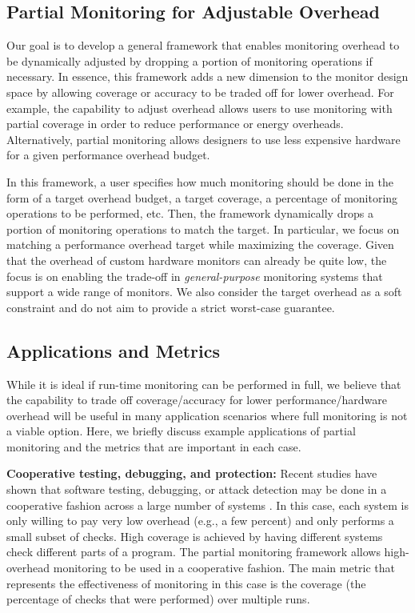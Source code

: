\subsection{Partial Monitoring for Adjustable Overhead}

Our goal is to develop a general framework that enables monitoring
overhead to be dynamically adjusted by dropping a portion of monitoring
operations if necessary. In essence, this framework adds a new dimension to the
monitor design space by allowing coverage or accuracy to be traded off for
lower overhead. For example, the capability to adjust overhead allows users to
use monitoring with partial coverage in order to reduce performance or energy
overheads. Alternatively, partial monitoring allows designers to use less
expensive hardware for a given performance overhead budget.

In this framework, a user specifies how much monitoring should be done in the
form of a target overhead budget, a target coverage, a percentage of monitoring
operations to be performed, etc.  Then, the framework dynamically drops a
portion of monitoring operations to match the target. In particular, we
focus on matching a performance overhead target while maximizing the
coverage. Given that the overhead of custom hardware monitors can already be
quite low, the focus is on enabling the trade-off in {\em general-purpose}
monitoring systems that support a wide range of monitors.  We also consider the
target overhead as a soft constraint and do not aim to provide a strict
worst-case guarantee.

\subsection{Applications and Metrics}

While it is ideal if run-time monitoring can be performed in full, we believe
that the capability to trade off coverage/accuracy for lower
performance/hardware overhead will be useful in many application scenarios
where full monitoring is not a viable option.  Here, we briefly discuss example
applications of partial monitoring and the metrics that are important in each
case.

{\bf Cooperative testing, debugging, and protection:} 
Recent studies have shown that software testing, debugging, or attack detection
may be done in a cooperative fashion across a large number of systems
\cite{liblit-pldi05, chilimbi-asplos04, greathouse-cgo11, testudo-micro08}. In
this case, each system is only willing to pay very low overhead (e.g., a few
percent) and only performs a small subset of checks.  High coverage is achieved
by having different systems check different parts of a program.  The partial
monitoring framework allows high-overhead monitoring to be used in a
cooperative fashion.  The main metric that represents the effectiveness of
monitoring in this case is the coverage (the percentage of checks that were
performed) over multiple runs.

